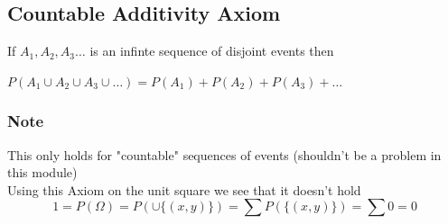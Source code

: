 \documentclass{article}
\begin{document}
\subsection*{Countable Additivity Axiom}
If \(A_1,A_2,A_3 \dots\) is an infinte sequence of disjoint events then

\(P(A_1 \cup A_2 \cup A_3 \cup \dots) = P(A_1) + P(A_2) + P(A_3) + \dots\)

\subsubsection*{Note}
This only holds for "countable" sequences of events (shouldn't be a problem in this module)
\\

Using this Axiom on the unit square we see that it doesn't hold
\[
1 = P(\Omega) = P(\cup \{(x,y)\}) = \sum P(\{(x,y)\}) = \sum 0 = 0
\]
\end{document}
